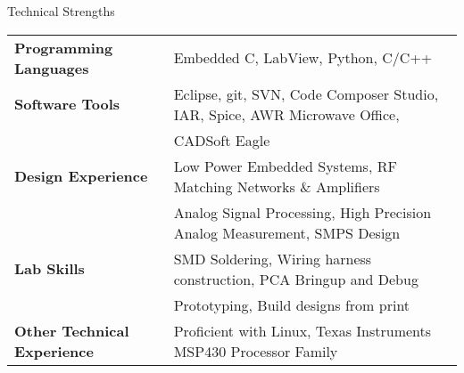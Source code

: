 \documentclass{resume} %
\begin{document}

\begin{rSection}{Technical Strengths}

\begin{tabular}{ @{} >{\bfseries}l @{\hspace{6ex}} l }
Programming Languages & Embedded C, LabView, Python, C/C++  \smallskip \\

Software Tools & Eclipse, git, SVN, Code Composer Studio, IAR, Spice, AWR Microwave Office, \\
 & CADSoft Eagle \smallskip \\

Design Experience & Low Power Embedded Systems, RF Matching Networks \& Amplifiers\\
 & Analog Signal Processing, High Precision Analog Measurement, SMPS Design \smallskip \\
 
Lab Skills & SMD Soldering, Wiring harness construction, PCA Bringup and Debug\\
 & Prototyping, Build designs from print \smallskip \\
 
Other Technical Experience & Proficient with Linux, Texas Instruments MSP430 Processor Family \\
\end{tabular}

\end{rSection}
\medskip
\end{document}
